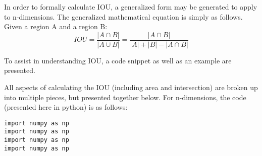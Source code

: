In order to formally calculate IOU, a generalized form may be generated to apply to n-dimensions. The generalized mathematical equation is simply as follows. Given a region A and a region B: 
\begin{equation}
IOU = \frac{|A\cap B|}{|A\cup B|} = \frac{|A\cap B|}{|A|+|B|- |A\cap B|}
\end{equation}

To assist in understanding IOU, a code snippet as well as an example are presented.

All aspects of calculating the IOU (including area and intersection) are broken up into multiple pieces, but presented together below. For n-dimensions, the code (presented here in python) is as follows: 



\begin{lstlisting}
import numpy as np
import numpy as np
import numpy as np
import numpy as np
\end{lstlisting}

%
%
%
%
%
%












